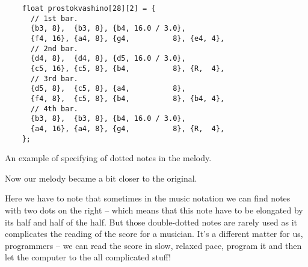 \documentclass[../sparc.tex]{subfiles}
\begin{document}
\begin{listing}[ht]
  \begin{verbatim}
    float prostokvashino[28][2] = {
      // 1st bar.
      {b3, 8},  {b3, 8}, {b4, 16.0 / 3.0},
      {f4, 16}, {a4, 8}, {g4,          8}, {e4, 4},
      // 2nd bar.
      {d4, 8},  {d4, 8}, {d5, 16.0 / 3.0},
      {c5, 16}, {c5, 8}, {b4,          8}, {R,  4},
      // 3rd bar.
      {d5, 8},  {c5, 8}, {a4,          8},
      {f4, 8},  {c5, 8}, {b4,          8}, {b4, 4},
      // 4th bar.
      {b3, 8},  {b3, 8}, {b4, 16.0 / 3.0},
      {a4, 16}, {a4, 8}, {g4,          8}, {R,  4},
    };
  \end{verbatim}
  \label{listing:music-dotted-notes}
  \caption{An example of specifying of dotted notes in the melody.}
\end{listing}

Now our melody became a bit closer to the original.

Here we have to note that sometimes in the music notation we can find notes with
two dots on the right -- which means that this note have to be elongated by its
half and half of the half.  But those double-dotted notes are rarely used as it
complicates the reading of the score for a musician.  It's a different matter
for us, programmers -- we can read the score in slow, relaxed pace, program it
and then let the computer to the all complicated stuff!
\end{document}
